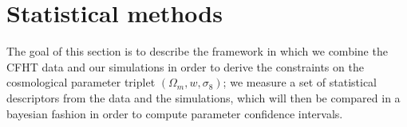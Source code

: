 \documentclass[reprint,aps,prd,superscriptaddress,showkeys,showpacs]{revtex4-1}
\begin{document}


\section{Statistical methods}
The goal of this section is to describe the framework in which we combine the CFHT data and our simulations in order to derive the constraints on the cosmological parameter triplet $(\Omega_m,w,\sigma_8)$; we measure a set of statistical descriptors from the data and the simulations, which will then be compared in a bayesian fashion in order to compute parameter confidence intervals.
\end{document}
